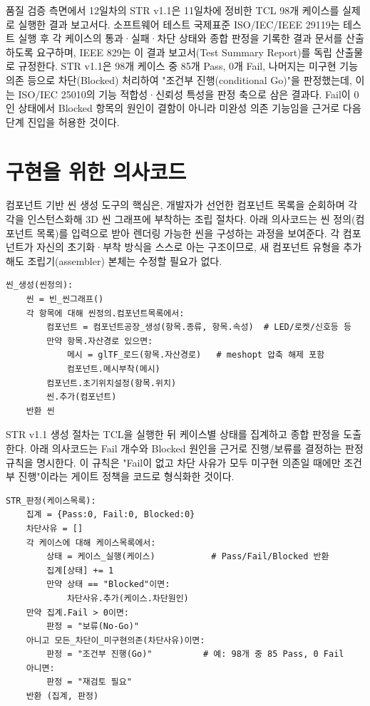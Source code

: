 품질 검증 측면에서 12일차의 STR v1.1은 11일차에 정비한 TCL 98개 케이스를 실제로 실행한 결과 보고서다. 소프트웨어 테스트 국제표준 ISO/IEC/IEEE 29119는 테스트 실행 후 각 케이스의 통과·실패·차단 상태와 종합 판정을 기록한 결과 문서를 산출하도록 요구하며\cite{iso29119}, IEEE 829는 이 결과 보고서(Test Summary Report)를 독립 산출물로 규정한다\cite{ieee829}. STR v1.1은 98개 케이스 중 85개 Pass, 0개 Fail, 나머지는 미구현 기능 의존 등으로 차단(Blocked) 처리하여 "조건부 진행(conditional Go)"을 판정했는데, 이는 ISO/IEC 25010의 기능 적합성·신뢰성 특성을 판정 축으로 삼은 결과다\cite{iso25010}. Fail이 0인 상태에서 Blocked 항목의 원인이 결함이 아니라 미완성 의존 기능임을 근거로 다음 단계 진입을 허용한 것이다.

\section{구현을 위한 의사코드}

컴포넌트 기반 씬 생성 도구의 핵심은, 개발자가 선언한 컴포넌트 목록을 순회하며 각각을 인스턴스화해 3D 씬 그래프에 부착하는 조립 절차다. 아래 의사코드는 씬 정의(컴포넌트 목록)를 입력으로 받아 렌더링 가능한 씬을 구성하는 과정을 보여준다. 각 컴포넌트가 자신의 초기화·부착 방식을 스스로 아는 구조이므로, 새 컴포넌트 유형을 추가해도 조립기(assembler) 본체는 수정할 필요가 없다.

\begin{verbatim}
씬_생성(씬정의):
    씬 = 빈_씬그래프()
    각 항목에 대해 씬정의.컴포넌트목록에서:
        컴포넌트 = 컴포넌트공장_생성(항목.종류, 항목.속성)  # LED/로켓/신호등 등
        만약 항목.자산경로 있으면:
            메시 = glTF_로드(항목.자산경로)   # meshopt 압축 해제 포함
            컴포넌트.메시부착(메시)
        컴포넌트.초기위치설정(항목.위치)
        씬.추가(컴포넌트)
    반환 씬
\end{verbatim}

STR v1.1 생성 절차는 TCL을 실행한 뒤 케이스별 상태를 집계하고 종합 판정을 도출한다. 아래 의사코드는 Fail 개수와 Blocked 원인을 근거로 진행/보류를 결정하는 판정 규칙을 명시한다. 이 규칙은 "Fail이 없고 차단 사유가 모두 미구현 의존일 때에만 조건부 진행"이라는 게이트 정책을 코드로 형식화한 것이다.

\begin{verbatim}
STR_판정(케이스목록):
    집계 = {Pass:0, Fail:0, Blocked:0}
    차단사유 = []
    각 케이스에 대해 케이스목록에서:
        상태 = 케이스_실행(케이스)           # Pass/Fail/Blocked 반환
        집계[상태] += 1
        만약 상태 == "Blocked"이면:
            차단사유.추가(케이스.차단원인)
    만약 집계.Fail > 0이면:
        판정 = "보류(No-Go)"
    아니고 모든_차단이_미구현의존(차단사유)이면:
        판정 = "조건부 진행(Go)"          # 예: 98개 중 85 Pass, 0 Fail
    아니면:
        판정 = "재검토 필요"
    반환 (집계, 판정)
\end{verbatim}

